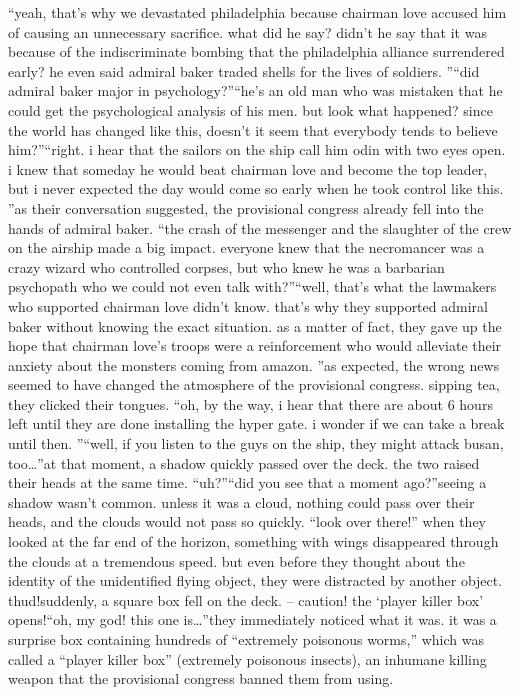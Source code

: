 “yeah, that’s why we devastated philadelphia because chairman love accused him of causing an unnecessary sacrifice.
 what did he say? didn’t he say that it was because of the indiscriminate bombing that the philadelphia alliance surrendered early? he even said admiral baker traded shells for the lives of soldiers.
”“did admiral baker major in psychology?”“he’s an old man who was mistaken that he could get the psychological analysis of his men.
 but look what happened? since the world has changed like this, doesn’t it seem that everybody tends to believe him?”“right.
 i hear that the sailors on the ship call him odin with two eyes open.
 i knew that someday he would beat chairman love and become the top leader, but i never expected the day would come so early when he took control like this.
”as their conversation suggested, the provisional congress already fell into the hands of admiral baker.
“the crash of the messenger and the slaughter of the crew on the airship made a big impact.
 everyone knew that the necromancer was a crazy wizard who controlled corpses, but who knew he was a barbarian psychopath who we could not even talk with?”“well, that’s what the lawmakers who supported chairman love didn’t know.
 that’s why they supported admiral baker without knowing the exact situation.
 as a matter of fact, they gave up the hope that chairman love’s troops were a reinforcement who would alleviate their anxiety about the monsters coming from amazon.
”as expected, the wrong news seemed to have changed the atmosphere of the provisional congress.
sipping tea, they clicked their tongues.
“oh, by the way, i hear that there are about 6 hours left until they are done installing the hyper gate.
 i wonder if we can take a break until then.
”“well, if you listen to the guys on the ship, they might attack busan, too…”at that moment, a shadow quickly passed over the deck.
 the two raised their heads at the same time.
“uh?”“did you see that a moment ago?”seeing a shadow wasn’t common.
 unless it was a cloud, nothing could pass over their heads, and the clouds would not pass so quickly.
“look over there!”
when they looked at the far end of the horizon, something with wings disappeared through the clouds at a tremendous speed.
but even before they thought about the identity of the unidentified flying object, they were distracted by another object.
thud!suddenly, a square box fell on the deck.
– caution! the ‘player killer box’ opens!“oh, my god! this one is…”they immediately noticed what it was.
 it was a surprise box containing hundreds of “extremely poisonous worms,” which was called a “player killer box” (extremely poisonous insects), an inhumane killing weapon that the provisional congress banned them from using.
